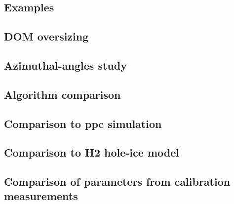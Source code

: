 \documentclass[green, 12pt]{beamer}
\begin{document}
\subsection{Examples}
  
  
  
  
  
  
  
  
  

%  

%  
%  

\subsection{DOM oversizing}
  

\subsection{Azimuthal-angles study}
  

\subsection{Algorithm comparison}
  

\subsection{Comparison to ppc simulation}
  
\subsection{Comparison to H2 hole-ice model}
  
\subsection{Comparison of parameters from calibration measurements}
  
\end{document}

